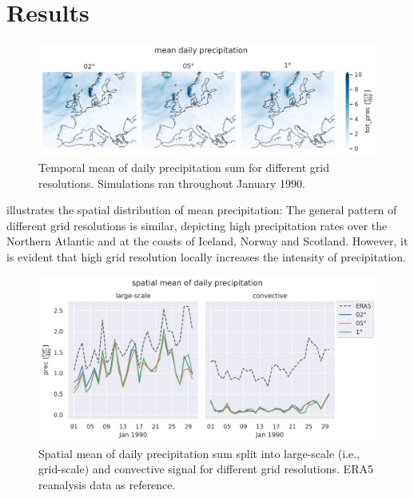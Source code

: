 \section{Results}


\begin{figure}
	\centering
	\includegraphics[width=\figwidth]{../figs/2-timmean.png}
	\caption{Temporal mean of daily precipitation sum for different grid resolutions. Simulations ran throughout January 1990.}
	\label{fig:timmean}
\end{figure}

 illustrates the spatial distribution of mean precipitation: The general pattern of different grid resolutions is similar, depicting high precipitation rates over the Northern Atlantic and at the coasts of Iceland, Norway and Scotland. However, it is evident that high grid resolution locally increases the intensity of precipitation.

\begin{figure}
	\centering
	\includegraphics[width=\figwidth]{../figs/5-gsp-con.png}
	\caption{Spatial mean of daily precipitation sum split into large-scale (i.e., grid-scale) and convective signal for different grid resolutions. ERA5 reanalysis data as reference.}
	\label{fig:fldmean}
\end{figure}

